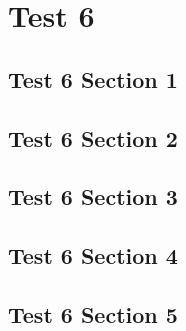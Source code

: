 \chapter{Test 6}
\localtableofcontents
\clearpage

\section{Test 6 Section 1}

\linebreak

\section{Test 6 Section 2}

\linebreak

\section{Test 6 Section 3}

\linebreak

\section{Test 6 Section 4}

\linebreak

\section{Test 6 Section 5}

\linebreak